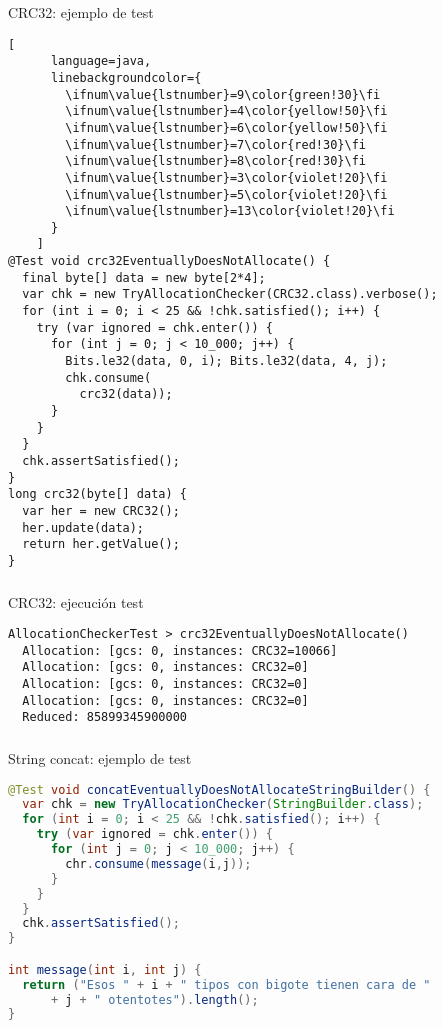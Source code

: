 \begin{frame}[fragile]
  \begin{block}{CRC32: ejemplo de test}
    \begin{lstlisting}[
      language=java,
      linebackgroundcolor={
        \ifnum\value{lstnumber}=9\color{green!30}\fi
        \ifnum\value{lstnumber}=4\color{yellow!50}\fi
        \ifnum\value{lstnumber}=6\color{yellow!50}\fi
        \ifnum\value{lstnumber}=7\color{red!30}\fi
        \ifnum\value{lstnumber}=8\color{red!30}\fi
        \ifnum\value{lstnumber}=3\color{violet!20}\fi
        \ifnum\value{lstnumber}=5\color{violet!20}\fi
        \ifnum\value{lstnumber}=13\color{violet!20}\fi
      }
    ]
@Test void crc32EventuallyDoesNotAllocate() {
  final byte[] data = new byte[2*4];
  var chk = new TryAllocationChecker(CRC32.class).verbose();
  for (int i = 0; i < 25 && !chk.satisfied(); i++) {
    try (var ignored = chk.enter()) {
      for (int j = 0; j < 10_000; j++) {
        Bits.le32(data, 0, i); Bits.le32(data, 4, j);
        chk.consume(
          crc32(data));
      }
    }
  }
  chk.assertSatisfied();
}
long crc32(byte[] data) {
  var her = new CRC32();
  her.update(data);
  return her.getValue();
}
    \end{lstlisting}
  \end{block}
\end{frame}

\begin{frame}[fragile]
  \frametitle{\ft}
  \begin{block}{CRC32: ejecución test}
    \begin{lstlisting}
AllocationCheckerTest > crc32EventuallyDoesNotAllocate()
  Allocation: [gcs: 0, instances: CRC32=10066]
  Allocation: [gcs: 0, instances: CRC32=0]
  Allocation: [gcs: 0, instances: CRC32=0]
  Allocation: [gcs: 0, instances: CRC32=0]
  Reduced: 85899345900000
    \end{lstlisting}
  \end{block}
\end{frame}


\begin{frame}[fragile]
  \frametitle{\ft}
  \begin{block}{String concat: ejemplo de test}
    \begin{lstlisting}[language=java]
@Test void concatEventuallyDoesNotAllocateStringBuilder() {
  var chk = new TryAllocationChecker(StringBuilder.class);
  for (int i = 0; i < 25 && !chk.satisfied(); i++) {
    try (var ignored = chk.enter()) {
      for (int j = 0; j < 10_000; j++) {
        chr.consume(message(i,j));
      }
    }
  }
  chk.assertSatisfied();
}

int message(int i, int j) {
  return ("Esos " + i + " tipos con bigote tienen cara de "
      + j + " otentotes").length();
}
    \end{lstlisting}
  \end{block}
\end{frame}

